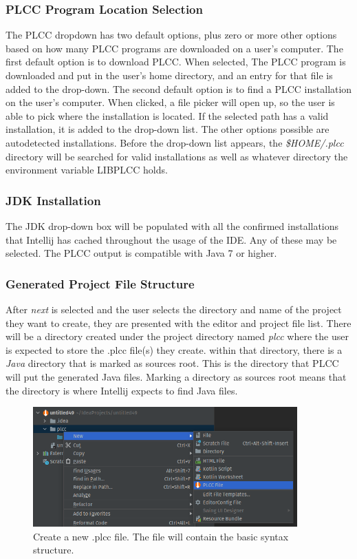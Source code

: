 \documentclass[conference, letterpaper]{IEEEtran}
\begin{document}
\subsubsection{PLCC Program Location Selection}\label{subsubsec:plcc-program-location}
The PLCC dropdown has two default options, plus zero or more other options based on how many PLCC programs are downloaded on a user's computer.
The first default option is to download PLCC\@.
When selected, The PLCC program is downloaded and put in the user's home directory, and an entry for that file is added to the drop-down.
The second default option is to find a PLCC installation on the user's computer.
When clicked, a file picker will open up, so the user is able to pick where the installation is located.
If the selected path has a valid installation, it is added to the drop-down list.
The other options possible are autodetected installations.
Before the drop-down list appears, the \textit{\$HOME/.plcc} directory will be searched for valid installations as well as whatever directory the environment variable LIBPLCC holds.

\subsubsection{JDK Installation}\label{subsubsec:jdk-installation}
The JDK drop-down box will be populated with all the confirmed installations that Intellij has cached throughout the usage of the IDE. Any of these may be selected.
The PLCC output is compatible with Java 7 or higher.

\subsubsection{Generated Project File Structure}\label{subsubsec:generated-project-file-structure}
After \textit{next} is selected and the user selects the directory and name of the project they want to create, they are presented with the editor and project file list.
There will be a directory created under the project directory named \textit{plcc} where the user is expected to store the .plcc file(s) they create.
within that directory, there is a \textit{Java} directory that is marked as sources root.
This is the directory that PLCC will put the generated Java files.
Marking a directory as sources root means that the directory is where Intellij expects to find Java files.

\begin{figure}[!t]
    \centering
    \includegraphics[width=4in]{new_PLCC_file_shortcut.png}
    \caption{Create a new .plcc file. The file will contain the basic syntax structure.}
    \label{fig:new_file_shortcut}
\end{figure}
\end{document}
